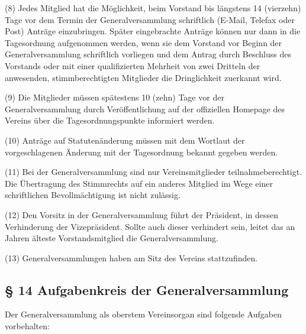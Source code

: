\documentclass[11pt,a4paper]{article}
\begin{document}
(8)
Jedes Mitglied hat die Möglichkeit, beim Vorstand bis längstens 14 (vierzehn) Tage vor dem Termin der Generalversammlung schriftlich (E-Mail, Telefax oder Post) Anträge einzubringen.
Später eingebrachte Anträge können nur dann in die Tagesordnung aufgenommen werden, wenn sie dem Vorstand vor Beginn der Generalversammlung schriftlich vorliegen und dem Antrag durch Beschluss des Vorstands oder mit einer qualifizierten Mehrheit von zwei Dritteln der anwesenden, stimmberechtigten Mitglieder die Dringlichkeit zuerkannt wird.

(9)
Die Mitglieder müssen spätestens 10 (zehn) Tage vor der Generalversammlung durch Veröffentlichung auf der offiziellen Homepage des Vereins über die Tagesordnungspunkte informiert werden.

(10)
Anträge auf Statutenänderung müssen mit dem Wortlaut der vorgeschlagenen Änderung mit der Tagesordnung bekannt gegeben werden.

(11)
Bei der Generalversammlung sind nur Vereinsmitglieder teilnahmeberechtigt.
Die Übertragung des Stimmrechts auf ein anderes Mitglied im Wege einer schriftlichen Bevollmächtigung ist nicht zulässig.

(12)
Den Vorsitz in der Generalversammlung führt der Präsident, in dessen Verhinderung der Vizepräsident.
Sollte auch dieser verhindert sein, leitet das an Jahren älteste Vorstandsmitglied die Generalversammlung.

(13)
Generalversammlungen haben am Sitz des Vereins stattzufinden.

\subsection{§ 14
Aufgabenkreis der Generalversammlung}

Der Generalversammlung als oberstem Vereinsorgan sind folgende Aufgaben vorbehalten:
\end{document}
